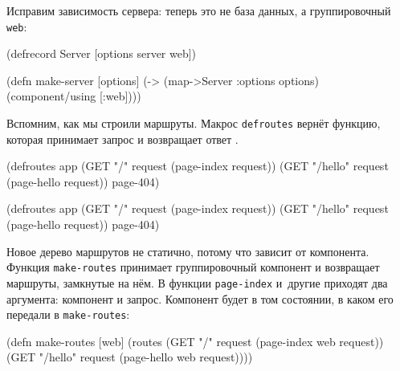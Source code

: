 
Исправим зависимость сервера: теперь это не база данных, а группировочный
\verb|web|:

\begin{english}
  \begin{clojure}
(defrecord Server
  [options server web])

(defn make-server [options]
  (-> (map->Server {:options options})
      (component/using [:web])))
  \end{clojure}
\end{english}


Вспомним, как мы строили маршруты. Макрос \verb|defroutes| вернёт функцию,
которая принимает запрос и возвращает ответ .

\ifx\DEVICETYPE\MOBILE

\begin{english}
  \begin{clojure}
(defroutes app
  (GET "/"
    request (page-index request))
  (GET "/hello"
    request (page-hello request))
  page-404)
  \end{clojure}
\end{english}

\else

\begin{english}
  \begin{clojure}
(defroutes app
  (GET "/"      request (page-index request))
  (GET "/hello" request (page-hello request))
  page-404)
  \end{clojure}
\end{english}

\fi

Новое дерево маршрутов не статично, потому что зависит от компонента. Функция
\verb|make-routes| принимает группировочный компонент и возвращает маршруты,
замкнутые на нём. В функции \verb|page-index| и~другие приходят два аргумента:
компонент и запрос. Компонент будет в том состоянии, в каком его передали в
\verb|make-routes|:

\ifx\DEVICETYPE\MOBILE

\begin{english}
  \begin{clojure}
(defn make-routes [web]
  (routes
    (GET "/"
      request (page-index web request))
    (GET "/hello"
      request (page-hello web request))))
  \end{clojure}
\end{english}

